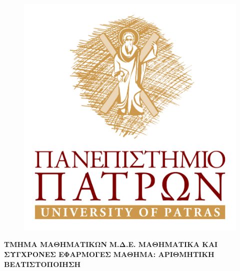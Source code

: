 \documentclass[a4paper,12pt,twoside]{report}
\theoremstyle{plain}
\theoremstyle{definition}
\theoremstyle{remark}
\begin{document}

\begin{figure}
  \centering
  \includegraphics[]{patrasLogo.jpg}
  \vspace*{0.3cm}
\end{figure}

\begin{center}
{\large \rm \textbf {ΤΜΗΜΑ ΜΑΘΗΜΑΤΙΚΩΝ} \linebreak}
{\large \rm \textbf {Μ.Δ.Ε. ΜΑΘΗΜΑΤΙΚΑ ΚΑΙ ΣΥΓΧΡΟΝΕΣ ΕΦΑΡΜΟΓΕΣ} \linebreak}
{\large \rm \textbf {ΜΑΘΗΜΑ: ΑΡΙΘΜΗΤΙΚΗ ΒΕΛΤΙΣΤΟΠΟΙΗΣΗ} \linebreak}

\end{center}
\baselineskip 30pt
\vspace*{0.3cm}
\end{document}
